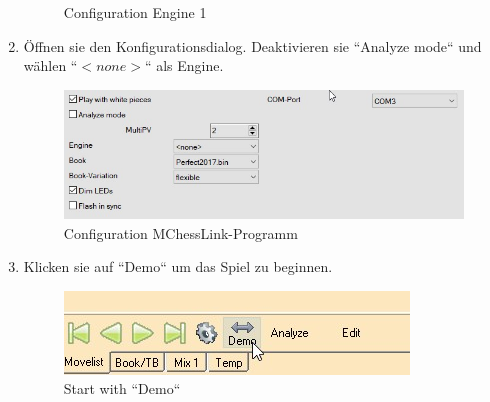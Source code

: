 \documentclass[11pt,a4paper]{article}
\begin{document}
\begin{enumerate}
\begin{figure}[H]
	\caption{Configuration Engine 1}
	\label{fig:ArenaConfigureEngine1}
\end{figure}
\item Öffnen sie den Konfigurationsdialog. Deaktivieren sie ``Analyze mode`` und wählen ``\begin{math}<none>\end{math}`` als Engine.
\begin{figure}[H]
	\centering
	\includegraphics[scale=0.7]{Arena_ConfigureMChessLink.jpg}
	\caption{Configuration MChessLink-Programm}
	\label{fig:ArenaConfigureCertabo}
\end{figure}
\item Klicken sie auf  ``Demo`` um das Spiel zu beginnen.
\begin{figure}[H]
	\centering
	\includegraphics[scale=0.7]{arena_demo.jpg}
	\caption{Start with ``Demo``}
	\label{fig:ArenaDemo}
\end{figure}
\end{enumerate}
\end{document}

